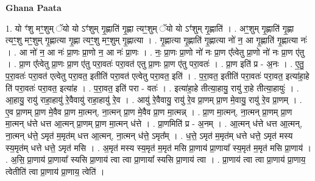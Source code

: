 \documentclass[17pt]{extarticle}
\begin{document}
\textbf{Ghana Paata } \newline

1. यो ꣳ॑शु मꣳ॒॒शुम् ॅयो यो ऽꣳ॑शुम् गृ॒ह्णाति॑ गृ॒ह्णा त्यꣳ॒॒शुम् ॅयो यो ऽꣳ॑शुम् गृ॒ह्णाति॑ । . अꣳ॒॒शुम् गृ॒ह्णाति॑ गृ॒ह्णा त्यꣳ॒॒शु मꣳ॒॒शुम् गृ॒ह्णात्या गृ॒ह्णा त्यꣳ॒॒शु मꣳ॒॒शुम् गृ॒ह्णात्या । . गृ॒ह्णात्या गृ॒ह्णाति॑ गृ॒ह्णात्या नो॑ न॒ आ गृ॒ह्णाति॑ गृ॒ह्णात्या नः॑ । . आ नो॑ न॒ आ नः॑ प्रा॒णः प्रा॒णो न॒ आ नः॑ प्रा॒णः । . नः॒ प्रा॒णः प्रा॒णो नो॑ नः प्रा॒ण ए᳚त्वेतु प्रा॒णो नो॑ नः प्रा॒ण ए॑तु । . प्रा॒ण ए᳚त्वेतु प्रा॒णः प्रा॒ण ए॑तु परा॒वतः॑ परा॒वत॑ एतु प्रा॒णः प्रा॒ण ए॑तु परा॒वतः॑ । . प्रा॒ण इति॑ प्र - अ॒नः । . ए॒तु॒ प॒रा॒वतः॑ परा॒वत॑ एत्वेतु परा॒वत॒ इतीति॑ परा॒वत॑ एत्वेतु परा॒वत॒ इति॑ । . प॒रा॒वत॒ इतीति॑ परा॒वतः॑ परा॒वत॒ इत्या॑हा॒हे ति॑ परा॒वतः॑ परा॒वत॒ इत्या॑ह । . प॒रा॒वत॒ इति॑ परा - वतः॑ । . इत्या॑हा॒हे तीत्या॒हायु॒ रायु॑ रा॒हे तीत्या॒हायुः॑ । . आ॒हायु॒ रायु॑ राहा॒हायु॑ रे॒वैवायु॑ राहा॒हायु॑ रे॒व । . आयु॑ रे॒वैवायु॒ रायु॑ रे॒व प्रा॒णम् प्रा॒ण मे॒वायु॒ रायु॑ रे॒व प्रा॒णम् । . ए॒व प्रा॒णम् प्रा॒ण मे॒वैव प्रा॒ण मा॒त्मन्, ना॒त्मन् प्रा॒ण मे॒वैव प्रा॒ण मा॒त्मन्न् । . प्रा॒ण मा॒त्मन्, ना॒त्मन् प्रा॒णम् प्रा॒ण मा॒त्मन् ध॑त्ते धत्त आ॒त्मन् प्रा॒णम् प्रा॒ण मा॒त्मन् ध॑त्ते । . प्रा॒णमिति॑ प्र - अ॒नम् । . आ॒त्मन् ध॑त्ते धत्त आ॒त्मन्, ना॒त्मन् ध॑त्ते॒ ऽमृत॑ म॒मृत॑म् धत्त आ॒त्मन्, ना॒त्मन् ध॑त्ते॒ ऽमृत᳚म् । . ध॒त्ते॒ ऽमृत॑ म॒मृत॑म् धत्ते धत्ते॒ ऽमृत॑ मस्य स्य॒मृत॑म् धत्ते धत्ते॒ ऽमृत॑ मसि । . अ॒मृत॑ मस्य स्य॒मृत॑ म॒मृत॑ मसि प्रा॒णाय॑ प्रा॒णाया᳚ स्य॒मृत॑ म॒मृत॑ मसि प्रा॒णाय॑ । . अ॒सि॒ प्रा॒णाय॑ प्रा॒णाया᳚ स्यसि प्रा॒णाय॑ त्वा त्वा प्रा॒णाया᳚ स्यसि प्रा॒णाय॑ त्वा । . प्रा॒णाय॑ त्वा त्वा प्रा॒णाय॑ प्रा॒णाय॒ त्वेतीति॑ त्वा प्रा॒णाय॑ प्रा॒णाय॒ त्वेति॑ । \newline
\end{document}
